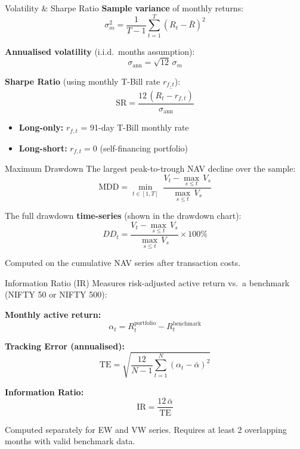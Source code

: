 \documentclass[aspectratio=169, 12pt]{beamer}
\begin{document}
\begin{frame}{Volatility \& Sharpe Ratio}
  \textbf{Sample variance} of monthly returns:
  \[
    \sigma_m^2 = \frac{1}{T-1}\sum_{t=1}^{T}(R_t - \bar{R})^2
  \]

  \textbf{Annualised volatility} (i.i.d.\ months assumption):
  \[
    \sigma_{\text{ann}} = \sqrt{12}\,\sigma_m
  \]

  \textbf{Sharpe Ratio} (using monthly T-Bill rate $r_{f,t}$):
  \[
    \mathrm{SR} = \frac{12\,\overline{(R_t - r_{f,t})}}{\sigma_{\text{ann}}}
  \]
  \begin{itemize}
    \item \textbf{Long-only:} $r_{f,t}$ = 91-day T-Bill monthly rate
    \item \textbf{Long-short:} $r_{f,t} = 0$ (self-financing portfolio)
  \end{itemize}
\end{frame}

\begin{frame}{Maximum Drawdown}
  The largest peak-to-trough NAV decline over the sample:
  \[
    \mathrm{MDD} = \min_{t \in [1,T]}\;\frac{V_t - \displaystyle\max_{s \leq t}\,V_s}{\displaystyle\max_{s \leq t}\,V_s}
  \]

  The full drawdown \textbf{time-series} (shown in the drawdown chart):
  \[
    DD_t = \frac{V_t - \displaystyle\max_{s \leq t}\,V_s}{\displaystyle\max_{s \leq t}\,V_s} \times 100\%
  \]

  Computed on the cumulative NAV series after transaction costs.
\end{frame}

\begin{frame}{Information Ratio (IR)}
  Measures risk-adjusted active return vs.\ a benchmark (NIFTY 50 or NIFTY 500):

  \medskip
  \textbf{Monthly active return:}
  \[
    \alpha_t = R_t^{\text{portfolio}} - R_t^{\text{benchmark}}
  \]

  \textbf{Tracking Error (annualised):}
  \[
    \mathrm{TE} = \sqrt{\frac{12}{N-1}\sum_{t=1}^{N}(\alpha_t - \bar{\alpha})^2}
  \]

  \textbf{Information Ratio:}
  \[
    \mathrm{IR} = \frac{12\,\bar{\alpha}}{\mathrm{TE}}
  \]

  Computed separately for EW and VW series. Requires at least 2 overlapping months with valid benchmark data.
\end{frame}

\end{document}
